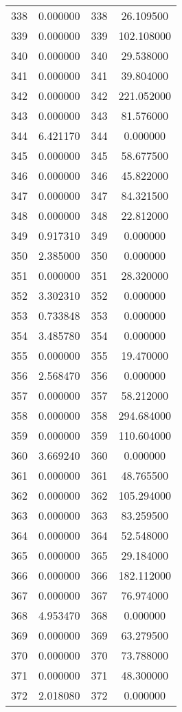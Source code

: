 \documentclass[12pt]{article}
\begin{document}
\begin{longtable}{@{}cccc@{}}
338 & 0.000000 & 338 & 26.109500 \\
339 & 0.000000 & 339 & 102.108000 \\
340 & 0.000000 & 340 & 29.538000 \\
341 & 0.000000 & 341 & 39.804000 \\
342 & 0.000000 & 342 & 221.052000 \\
343 & 0.000000 & 343 & 81.576000 \\
344 & 6.421170 & 344 & 0.000000 \\
345 & 0.000000 & 345 & 58.677500 \\
346 & 0.000000 & 346 & 45.822000 \\
347 & 0.000000 & 347 & 84.321500 \\
348 & 0.000000 & 348 & 22.812000 \\
349 & 0.917310 & 349 & 0.000000 \\
350 & 2.385000 & 350 & 0.000000 \\
351 & 0.000000 & 351 & 28.320000 \\
352 & 3.302310 & 352 & 0.000000 \\
353 & 0.733848 & 353 & 0.000000 \\
354 & 3.485780 & 354 & 0.000000 \\
355 & 0.000000 & 355 & 19.470000 \\
356 & 2.568470 & 356 & 0.000000 \\
357 & 0.000000 & 357 & 58.212000 \\
358 & 0.000000 & 358 & 294.684000 \\
359 & 0.000000 & 359 & 110.604000 \\
360 & 3.669240 & 360 & 0.000000 \\
361 & 0.000000 & 361 & 48.765500 \\
362 & 0.000000 & 362 & 105.294000 \\
363 & 0.000000 & 363 & 83.259500 \\
364 & 0.000000 & 364 & 52.548000 \\
365 & 0.000000 & 365 & 29.184000 \\
366 & 0.000000 & 366 & 182.112000 \\
367 & 0.000000 & 367 & 76.974000 \\
368 & 4.953470 & 368 & 0.000000 \\
369 & 0.000000 & 369 & 63.279500 \\
370 & 0.000000 & 370 & 73.788000 \\
371 & 0.000000 & 371 & 48.300000 \\
372 & 2.018080 & 372 & 0.000000 \\

\end{longtable}
\end{document}
